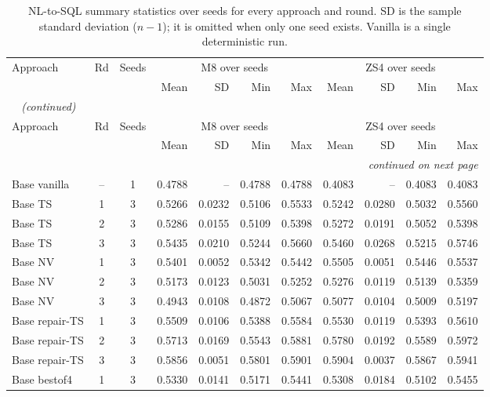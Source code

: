 {\small
{}
\setlength{\tabcolsep}{4.2pt}
\begin{longtable}{@{}lccrrrrrrrr@{}}
\caption{NL-to-SQL summary statistics over seeds for every approach and round. SD is the sample standard deviation ($n-1$); it is omitted when only one seed exists. Vanilla is a single deterministic run.}\label{tab:gen-round-stats}\\
\toprule
\rowcolor{headshade}Approach & Rd & Seeds & \multicolumn{4}{c}{M8 over seeds} & \multicolumn{4}{c}{ZS4 over seeds}\\\rowcolor{headshade} & & & Mean & SD & Min & Max & Mean & SD & Min & Max\\
\midrule
\endfirsthead
\multicolumn{11}{l}{\textit{\tablename~\thetable{} (continued)}}\\
\toprule
\rowcolor{headshade}Approach & Rd & Seeds & \multicolumn{4}{c}{M8 over seeds} & \multicolumn{4}{c}{ZS4 over seeds}\\\rowcolor{headshade} & & & Mean & SD & Min & Max & Mean & SD & Min & Max\\
\midrule
\endhead
\midrule
\multicolumn{11}{r}{\textit{continued on next page}}\\
\endfoot
\bottomrule
\endlastfoot
Base vanilla & -- & 1 & 0.4788 & -- & 0.4788 & 0.4788 & 0.4083 & -- & 0.4083 & 0.4083\\
Base TS & 1 & 3 & 0.5266 & 0.0232 & 0.5106 & 0.5533 & 0.5242 & 0.0280 & 0.5032 & 0.5560\\
Base TS & 2 & 3 & 0.5286 & 0.0155 & 0.5109 & 0.5398 & 0.5272 & 0.0191 & 0.5052 & 0.5398\\
Base TS & 3 & 3 & 0.5435 & 0.0210 & 0.5244 & 0.5660 & 0.5460 & 0.0268 & 0.5215 & 0.5746\\
Base NV & 1 & 3 & 0.5401 & 0.0052 & 0.5342 & 0.5442 & 0.5505 & 0.0051 & 0.5446 & 0.5537\\
Base NV & 2 & 3 & 0.5173 & 0.0123 & 0.5031 & 0.5252 & 0.5276 & 0.0119 & 0.5139 & 0.5359\\
Base NV & 3 & 3 & 0.4943 & 0.0108 & 0.4872 & 0.5067 & 0.5077 & 0.0104 & 0.5009 & 0.5197\\
Base repair-TS & 1 & 3 & 0.5509 & 0.0106 & 0.5388 & 0.5584 & 0.5530 & 0.0119 & 0.5393 & 0.5610\\
Base repair-TS & 2 & 3 & 0.5713 & 0.0169 & 0.5543 & 0.5881 & 0.5780 & 0.0192 & 0.5589 & 0.5972\\
Base repair-TS & 3 & 3 & 0.5856 & 0.0051 & 0.5801 & 0.5901 & 0.5904 & 0.0037 & 0.5867 & 0.5941\\
Base bestof4 & 1 & 3 & 0.5330 & 0.0141 & 0.5171 & 0.5441 & 0.5308 & 0.0184 & 0.5102 & 0.5455\\

\end{longtable}}
